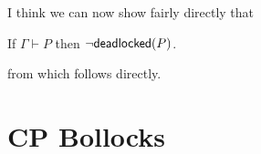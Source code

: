 \documentclass[orivec,envcountsame]{llncs}
\begin{document}
I think we can now show fairly directly that

\begin{lemma}\label{thm:typed-configs-df}
  If $\Gamma \vdash P$ then $\lnot \mathsf{deadlocked}(P)$.
\end{lemma}
from which  follows directly.


\section{CP Bollocks}
\end{document}
